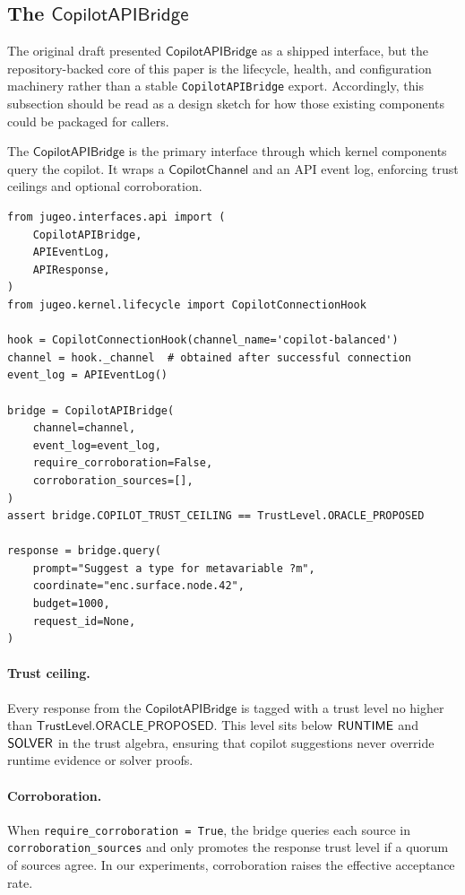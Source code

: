 \documentclass[11pt]{article}
\newcommand{\CAB}{\mathsf{CopilotAPIBridge}}
\newcommand{\CC}{\mathsf{CopilotChannel}}
\newcommand{\TL}{\mathsf{TrustLevel}}
\begin{document}
\subsection{The \texorpdfstring{$\CAB$}{CopilotAPIBridge}}

The original draft presented $\CAB$ as a shipped interface, but the
repository-backed core of this paper is the lifecycle, health, and
configuration machinery rather than a stable
\texttt{CopilotAPIBridge} export.  Accordingly, this subsection should
be read as a design sketch for how those existing components could be
packaged for callers.

The $\CAB$ is the primary interface through which
kernel components query the copilot.  It wraps a $\CC$ and
an API event log, enforcing trust ceilings and optional
corroboration.

\begin{lstlisting}[style=jugeo-python, caption={Querying through
  the $\CAB$.}]
from jugeo.interfaces.api import (
    CopilotAPIBridge,
    APIEventLog,
    APIResponse,
)
from jugeo.kernel.lifecycle import CopilotConnectionHook

hook = CopilotConnectionHook(channel_name='copilot-balanced')
channel = hook._channel  # obtained after successful connection
event_log = APIEventLog()

bridge = CopilotAPIBridge(
    channel=channel,
    event_log=event_log,
    require_corroboration=False,
    corroboration_sources=[],
)
assert bridge.COPILOT_TRUST_CEILING == TrustLevel.ORACLE_PROPOSED

response = bridge.query(
    prompt="Suggest a type for metavariable ?m",
    coordinate="enc.surface.node.42",
    budget=1000,
    request_id=None,
)
\end{lstlisting}

\paragraph{Trust ceiling.}
Every response from the $\CAB$ is tagged with a trust
level no higher than
$\TL.\mathsf{ORACLE\_PROPOSED}$.  This level sits below
$\mathsf{RUNTIME}$ and $\mathsf{SOLVER}$ in the \JuGeo{} trust algebra,
ensuring that copilot suggestions never override runtime evidence
or solver proofs.

\paragraph{Corroboration.}
When \texttt{require\_corroboration = True}, the bridge queries
each source in \texttt{corroboration\_sources} and only promotes
the response trust level if a quorum of sources agree.  In our
experiments, corroboration raises the effective acceptance rate.
\end{document}
